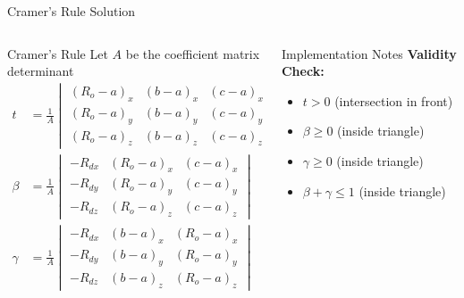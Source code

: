 \begin{frame}{Cramer's Rule Solution}
    \begin{columns}
        \begin{column}{0.5\textwidth}
            \begin{mathbox}{Cramer's Rule}
                Let $A$ be the coefficient matrix determinant
                \begin{align}
                    t &= \frac{1}{A} \begin{vmatrix}
                        (R_o-a)_x & (b-a)_x & (c-a)_x \\
                        (R_o-a)_y & (b-a)_y & (c-a)_y \\
                        (R_o-a)_z & (b-a)_z & (c-a)_z
                    \end{vmatrix} \\
                    \beta &= \frac{1}{A} \begin{vmatrix}
                        -R_{dx} & (R_o-a)_x & (c-a)_x \\
                        -R_{dy} & (R_o-a)_y & (c-a)_y \\
                        -R_{dz} & (R_o-a)_z & (c-a)_z
                    \end{vmatrix} \\
                    \gamma &= \frac{1}{A} \begin{vmatrix}
                        -R_{dx} & (b-a)_x & (R_o-a)_x \\
                        -R_{dy} & (b-a)_y & (R_o-a)_y \\
                        -R_{dz} & (b-a)_z & (R_o-a)_z
                    \end{vmatrix}
                \end{align}
            \end{mathbox}
        \end{column}
        \begin{column}{0.5\textwidth}
            \begin{conceptbox}{Implementation Notes}
                \textbf{Validity Check:}
                \begin{itemize}
                    \item $t > 0$ (intersection in front)
                    \item $\beta \geq 0$ (inside triangle)
                    \item $\gamma \geq 0$ (inside triangle)
                    \item $\beta + \gamma \leq 1$ (inside triangle)
                \end{itemize}
                

\end{conceptbox}
\end{column}
\end{columns}
\end{frame}
